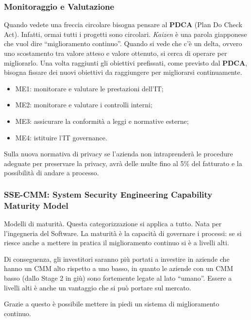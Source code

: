 \subsubsection{Monitoraggio e Valutazione}
Quando vedete una freccia circolare bisogna pensare al \textbf{PDCA} (Plan Do
Check Act). Infatti, ormai tutti i progetti sono circolari. \emph{Kaizen} è
una parola giapponese che vuol dire “miglioramento continuo”. Quando si vede
che c’è un delta, ovvero uno scostamento tra valore atteso e valore ottenuto,
si cerca di operare per migliorarlo. Una volta raggiunti gli obiettivi
prefissati, come previsto dal \textbf{PDCA}, bisogna fissare dei nuovi
obiettivi da raggiungere per migliorarsi continuamente.

\begin{itemize}
\item ME1: monitorare e valutare le prestazioni dell'IT;
\item ME2: monitorare e valutare i controlli interni;
\item ME3: assicurare la conformità a leggi e normative esterne;
\item ME4: istituire l'IT governance.
\end{itemize}

Sulla nuova normativa di privacy se l'azienda non intraprenderà le procedure
adeguate per preservare la privacy, avrà delle multe fino al 5\% del fatturato
e la possibilità di andare a processo.

\subsubsection{SSE-CMM: System Security Engineering Capability Maturity Model}

Modelli di maturità. Questa categorizzazione si applica a tutto. Nata per
l'ingegneria del Software.
La maturità è la capacità di governare i processi: se si riesce anche a
mettere in pratica il miglioramento continuo si è a livelli alti.

Di conseguenza, gli investitori saranno più portati a investire in aziende che
hanno un CMM alto rispetto a uno basso, in quanto le aziende con
un CMM basso (dallo Stage 2
in giù) sono fortemente legate al lato ``umano''. 
Essere a livelli alti è anche un vantaggio che si può portare sul 
mercato.

Grazie a questo è possibile mettere in piedi un sistema di miglioramento
continuo.

